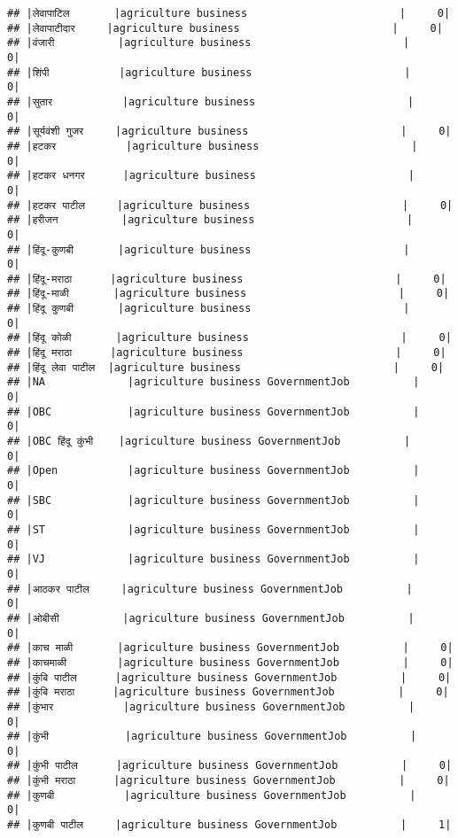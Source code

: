 \documentclass[
]{article}
\begin{document}
\begin{verbatim}
## |लेवापाटिल       |agriculture business                        |     0|
## |लेवापाटीदार     |agriculture business                        |     0|
## |वंजारी          |agriculture business                        |     0|
## |शिंपी           |agriculture business                        |     0|
## |सुतार           |agriculture business                        |     0|
## |सूर्यवंशी गुजर     |agriculture business                        |     0|
## |हटकर           |agriculture business                        |     0|
## |हटकर धनगर      |agriculture business                        |     0|
## |हटकर पाटील     |agriculture business                        |     0|
## |हरीजन          |agriculture business                        |     0|
## |हिंदू-कुणबी       |agriculture business                        |     0|
## |हिंदू-मराठा      |agriculture business                        |     0|
## |हिंदू-माळी       |agriculture business                        |     0|
## |हिंदू कुणबी       |agriculture business                        |     0|
## |हिंदू कोळी       |agriculture business                        |     0|
## |हिंदू मराठा      |agriculture business                        |     0|
## |हिंदू लेवा पाटील  |agriculture business                        |     0|
## |NA             |agriculture business GovernmentJob          |     0|
## |OBC            |agriculture business GovernmentJob          |     0|
## |OBC हिंदू कुंभी    |agriculture business GovernmentJob          |     0|
## |Open           |agriculture business GovernmentJob          |     0|
## |SBC            |agriculture business GovernmentJob          |     0|
## |ST             |agriculture business GovernmentJob          |     0|
## |VJ             |agriculture business GovernmentJob          |     0|
## |आठकर पाटील     |agriculture business GovernmentJob          |     0|
## |ओबीसी          |agriculture business GovernmentJob          |     0|
## |काच माळी       |agriculture business GovernmentJob          |     0|
## |काचमाळी        |agriculture business GovernmentJob          |     0|
## |कुंबि पाटील      |agriculture business GovernmentJob          |     0|
## |कुंबि मराठा      |agriculture business GovernmentJob          |     0|
## |कुंभार           |agriculture business GovernmentJob          |     0|
## |कुंभी            |agriculture business GovernmentJob          |     0|
## |कुंभी पाटील      |agriculture business GovernmentJob          |     0|
## |कुंभी मराठा      |agriculture business GovernmentJob          |     0|
## |कुणबी           |agriculture business GovernmentJob          |     0|
## |कुणबी पाटील     |agriculture business GovernmentJob          |     1|

\end{verbatim}
\end{document}
